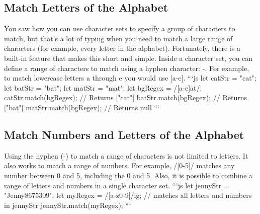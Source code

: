 \documentclass{article}%
\begin{document}
\subsection{Match Letters of the Alphabet}%
\label{subsec:MatchLettersoftheAlphabet}%
You saw how you can use character sets to specify a group of characters to match, but that's a lot of typing when you need to match a large range of characters (for example, every letter in the alphabet). Fortunately, there is a built{-}in feature that makes this short and simple.\newline%
Inside a character set, you can define a range of characters to match using a hyphen character: {-}.\newline%
For example, to match lowercase letters a through e you would use {[}a{-}e{]}.\newline%
```js\newline%
let catStr = "cat";\newline%
let batStr = "bat";\newline%
let matStr = "mat";\newline%
let bgRegex = /{[}a{-}e{]}at/;\newline%
catStr.match(bgRegex); // Returns {[}"cat"{]}\newline%
batStr.match(bgRegex); // Returns {[}"bat"{]}\newline%
matStr.match(bgRegex); // Returns null\newline%
```\newline%

%
\subsection{Match Numbers and Letters of the Alphabet}%
\label{subsec:MatchNumbersandLettersoftheAlphabet}%
Using the hyphen ({-}) to match a range of characters is not limited to letters. It also works to match a range of numbers.\newline%
For example, /{[}0{-}5{]}/ matches any number between 0 and 5, including the 0 and 5.\newline%
Also, it is possible to combine a range of letters and numbers in a single character set.\newline%
```js\newline%
let jennyStr = "Jenny8675309";\newline%
let myRegex = /{[}a{-}z0{-}9{]}/ig;\newline%
// matches all letters and numbers in jennyStr\newline%
jennyStr.match(myRegex);\newline%
```\newline%
\end{document}
